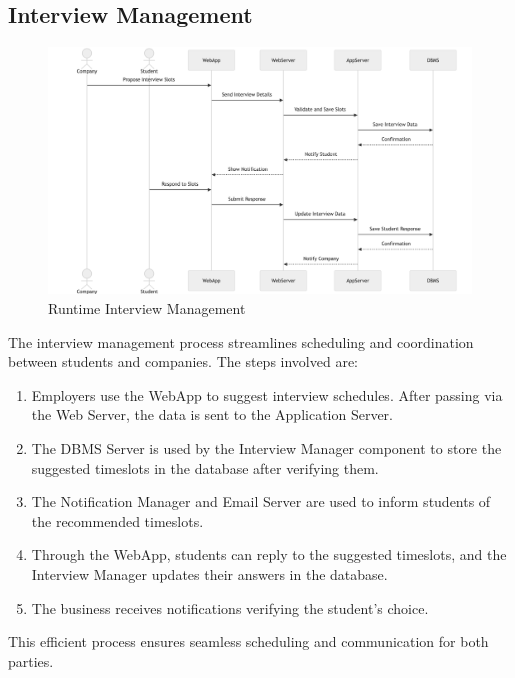 \subsection{Interview Management}
\label{subsec:interview_management}
\begin{figure}[H]
    \begin{center}
        \includegraphics[width=0.82\linewidth]{JhaBhatiaSharma/imagesDD/InterviewManagementRuntime.png}
        \caption{Runtime Interview Management}
    \label{fig:interviewmanagementruntime}%
    \end{center}
\end{figure}

The interview management process streamlines scheduling and coordination between students and companies. The steps involved are:
\begin{enumerate}
    \item Employers use the WebApp to suggest interview schedules. After passing via the Web Server, the data is sent to the Application Server.
    \item The DBMS Server is used by the Interview Manager component to store the suggested timeslots in the database after verifying them.
    \item The Notification Manager and Email Server are used to inform students of the recommended timeslots.
    \item Through the WebApp, students can reply to the suggested timeslots, and the Interview Manager updates their answers in the database.
    \item The business receives notifications verifying the student's choice.
\end{enumerate}
This efficient process ensures seamless scheduling and communication for both parties.

